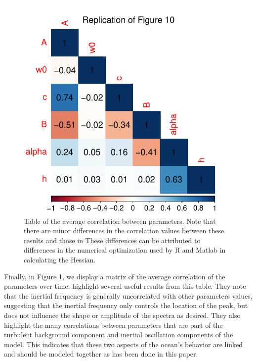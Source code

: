 \documentclass{stat572Style}
\begin{document}
 \begin{figure}[h!]
  \centering
    \includegraphics[width=.6\textwidth]{ReplicatedFigures/fig10.pdf}
        \caption{Table of the average correlation between parameters. Note that there are  minor differences in the correlation values between these results and those in \citet{Sykulski2016} These differences can be attributed to differences in the numerical optimization used by R and Matlab in calculating the Hessian. }
        	\label{fig: fig10}
\end{figure}


\par Finally, in Figure \ref{fig: fig10}, we display a matrix of the average correlation of the parameters over time. \citet{Sykulski2016} highlight several useful results from this table. 
They note that the inertial frequency is generally uncorrelated with other parameters values, suggesting that the inertial frequency only controls the location of the peak, but does not influence the shape or amplitude of the spectra as desired. 
They also highlight the many correlations between parameters that are part of the turbulent background component and inertial oscillation components of the model. 
This indicates that these two aspects of the ocean's behavior are linked and should be modeled together as has been done in this paper. 
\end{document}
